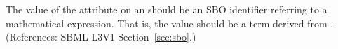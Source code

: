 The value of the  attribute on an \EventAssignment should be an
SBO identifier referring to a mathematical expression.  That is, the value
should be a term derived from \sbomathformula.  (References: 
SBML L3V1 Section~\ref{sec:sbo}.)
